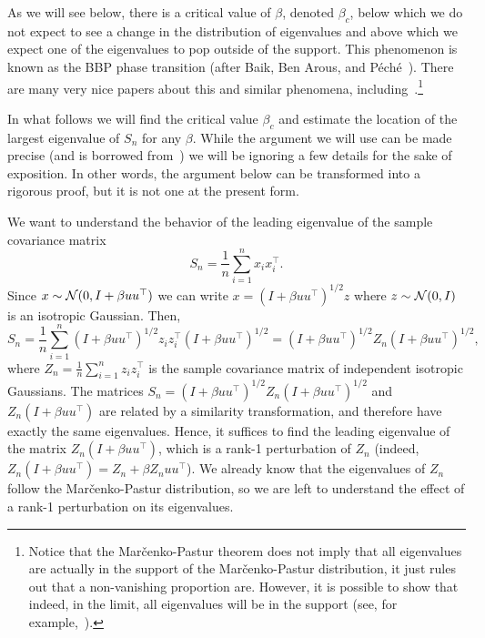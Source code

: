 \medskip

As we will see below, there is a critical value of $\beta$, denoted $\beta_c$, below which we do not expect to see a change in the distribution of eigenvalues and above which we expect one of the eigenvalues to pop outside of the support. This phenomenon is known as the BBP phase transition (after Baik, Ben Arous, and P\'ech\'e~\cite{BPP_MC_BPP_2005}). There are many very nice papers about this and similar phenomena, including~\cite{Paul_Marchenko_Pastur_BPP_TechReport,Johnston_MC_BPP,BPP_MC_BPP_2005,Paul_Marchenko_Pastur_BPP_ActualPaper,Baik_Silverstein_BPP_05,Karoui_BPP_05,BenaychGeorges_Nadakuditi_PCA,BenaychGeorges_Nadakuditi_SVD}.\footnote{Notice that the Mar\v{c}enko-Pastur theorem does not imply that all eigenvalues are actually in the support of the Mar\v{c}enko-Pastur distribution, it just rules out that a non-vanishing proportion are. However, it is possible to show that indeed, in the limit, all eigenvalues will be in the support (see, for example,~\cite{Paul_Marchenko_Pastur_BPP_TechReport}).}

In what follows we will find the critical value $\beta_c$ and estimate the location of the largest eigenvalue of $S_n$ for any $\beta$. While the argument we will use can be made precise (and is borrowed from~\cite{Paul_Marchenko_Pastur_BPP_TechReport}) we will be ignoring a few details for the sake of exposition. In other words, the argument below can be transformed into a rigorous proof, but it is not one at the present form.

We want to understand the behavior of the leading eigenvalue of the sample covariance matrix
\[
S_n = \frac1n\sum_{i=1}^n x_ix_i^\top  .
\]
Since $x \sim \mathcal{N}(0,I+\beta uu^\top  )$ we can write $x = (I + \beta uu^\top  )^{1/2} z$ where $z \sim \mathcal{N}(0,I)$ is an isotropic Gaussian. Then,
\[
S_n = \frac{1}{n} \sum_{i=1}^n (I + \beta uu^\top  )^{1/2} z_i z_i^\top   (I + \beta uu^\top  )^{1/2} = (I + \beta uu^\top  )^{1/2} Z_n (I + \beta uu^\top  )^{1/2},
\]
where $Z_n = \frac{1}{n} \sum_{i=1}^n z_i z_i^\top  $ is the sample covariance matrix of independent isotropic Gaussians. The matrices $S_n = (I + \beta uu^\top  )^{1/2} Z_n (I + \beta uu^\top  )^{1/2}$ and $Z_n (I + \beta uu^\top  )$ are related by a similarity transformation, and therefore have exactly the same eigenvalues. Hence, it suffices to find the leading eigenvalue of the matrix $Z_n(I + \beta uu^\top  )$, which is a rank-1 perturbation of $Z_n$ (indeed, $Z_n(I + \beta uu^\top  ) = Z_n + \beta Z_n uu^\top  $). We already know that the eigenvalues of $Z_n$ follow the Mar\v{c}enko-Pastur distribution, so we are left to understand the effect of a rank-1 perturbation on its eigenvalues.

